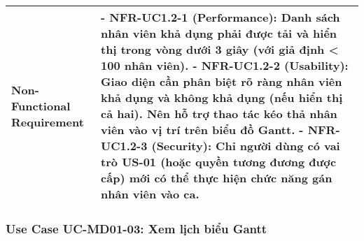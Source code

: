 \begin{longtable}{|m{4cm}|p{11cm}|}
\hline
Non-Functional Requirement & - \textbf{NFR-UC1.2-1 (Performance):} Danh sách nhân viên khả dụng phải được tải và hiển thị trong vòng dưới 3 giây (với giả định < 100 nhân viên). \newline - \textbf{NFR-UC1.2-2 (Usability):} Giao diện cần phân biệt rõ ràng nhân viên khả dụng và không khả dụng (nếu hiển thị cả hai). Nên hỗ trợ thao tác kéo thả nhân viên vào vị trí trên biểu đồ Gantt. \newline - \textbf{NFR-UC1.2-3 (Security):} Chỉ người dùng có vai trò US-01 (hoặc quyền tương đương được cấp) mới có thể thực hiện chức năng gán nhân viên vào ca. \\
\hline

\end{longtable}


\subsubsection{Use Case UC-MD01-03: Xem lịch biểu Gantt}


